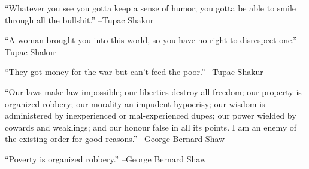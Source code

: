 \documentclass{article}%
\begin{document}
\linebreak%
\vspace{1mm}%
\begin{minipage}{\textwidth}%
\flushleft%
“Whatever you see you gotta keep a sense of humor; you gotta be able to smile through all the bullshit.”%
\linebreak%
\vspace{1mm}%
–Tupac Shakur%
\linebreak%
\vspace{1mm}%
\end{minipage}%
\linebreak%
\vspace{1mm}%
\begin{minipage}{\textwidth}%
\flushleft%
“A woman brought you into this world, so you have no right to disrespect one.”%
\linebreak%
\vspace{1mm}%
–Tupac Shakur%
\linebreak%
\vspace{1mm}%
\end{minipage}%
\linebreak%
\vspace{1mm}%
\begin{minipage}{\textwidth}%
\flushleft%
“They got money for the war but can't feed the poor.”%
\linebreak%
\vspace{1mm}%
–Tupac Shakur%
\linebreak%
\vspace{1mm}%
\end{minipage}%
\linebreak%
\vspace{1mm}%
\begin{minipage}{\textwidth}%
\flushleft%
“Our laws make law impossible; our liberties destroy all freedom; our property is organized robbery; our morality an impudent hypocrisy; our wisdom is administered by inexperienced or mal{-}experienced dupes; our power wielded by cowards and weaklings; and our honour false in all its points. I am an enemy of the existing order for good reasons.”%
\linebreak%
\vspace{1mm}%
–George Bernard Shaw%
\linebreak%
\vspace{1mm}%
\end{minipage}%
\linebreak%
\vspace{1mm}%
\begin{minipage}{\textwidth}%
\flushleft%
“Poverty is organized robbery.”%
\linebreak%
\vspace{1mm}%
–George Bernard Shaw%
\linebreak%
\vspace{1mm}%
\end{minipage}%
\end{document}
